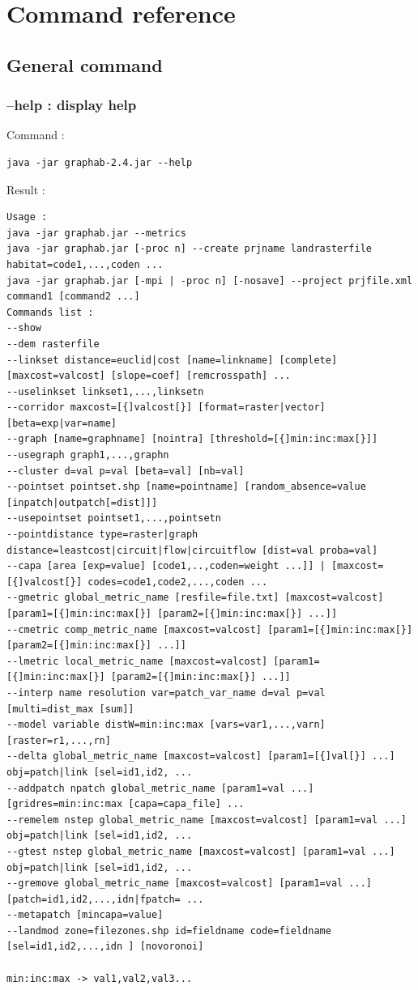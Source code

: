 \documentclass[a4paper,10pt]{report}
\begin{document}
\chapter{Command reference}
\section{General command}
\subsection{--help : display help}
Command :
\begin{Verbatim}
java -jar graphab-2.4.jar --help
\end{Verbatim}
Result :
\begin{verbatim}
Usage :
java -jar graphab.jar --metrics
java -jar graphab.jar [-proc n] --create prjname landrasterfile habitat=code1,...,coden ...
java -jar graphab.jar [-mpi | -proc n] [-nosave] --project prjfile.xml command1 [command2 ...]
Commands list :
--show
--dem rasterfile
--linkset distance=euclid|cost [name=linkname] [complete] [maxcost=valcost] [slope=coef] [remcrosspath] ...
--uselinkset linkset1,...,linksetn
--corridor maxcost=[{]valcost[}] [format=raster|vector] [beta=exp|var=name]
--graph [name=graphname] [nointra] [threshold=[{]min:inc:max[}]]
--usegraph graph1,...,graphn
--cluster d=val p=val [beta=val] [nb=val]
--pointset pointset.shp [name=pointname] [random_absence=value [inpatch|outpatch[=dist]]]
--usepointset pointset1,...,pointsetn
--pointdistance type=raster|graph distance=leastcost|circuit|flow|circuitflow [dist=val proba=val]
--capa [area [exp=value] [code1,..,coden=weight ...]] | [maxcost=[{]valcost[}] codes=code1,code2,...,coden ...
--gmetric global_metric_name [resfile=file.txt] [maxcost=valcost] [param1=[{]min:inc:max[}] [param2=[{]min:inc:max[}] ...]]
--cmetric comp_metric_name [maxcost=valcost] [param1=[{]min:inc:max[}] [param2=[{]min:inc:max[}] ...]]
--lmetric local_metric_name [maxcost=valcost] [param1=[{]min:inc:max[}] [param2=[{]min:inc:max[}] ...]]
--interp name resolution var=patch_var_name d=val p=val [multi=dist_max [sum]]
--model variable distW=min:inc:max [vars=var1,...,varn] [raster=r1,...,rn]
--delta global_metric_name [maxcost=valcost] [param1=[{]val[}] ...] obj=patch|link [sel=id1,id2, ...
--addpatch npatch global_metric_name [param1=val ...] [gridres=min:inc:max [capa=capa_file] ...
--remelem nstep global_metric_name [maxcost=valcost] [param1=val ...] obj=patch|link [sel=id1,id2, ...
--gtest nstep global_metric_name [maxcost=valcost] [param1=val ...] obj=patch|link [sel=id1,id2, ...
--gremove global_metric_name [maxcost=valcost] [param1=val ...] [patch=id1,id2,...,idn|fpatch= ...
--metapatch [mincapa=value]
--landmod zone=filezones.shp id=fieldname code=fieldname [sel=id1,id2,...,idn ] [novoronoi]

min:inc:max -> val1,val2,val3...
\end{verbatim}
\end{document}
